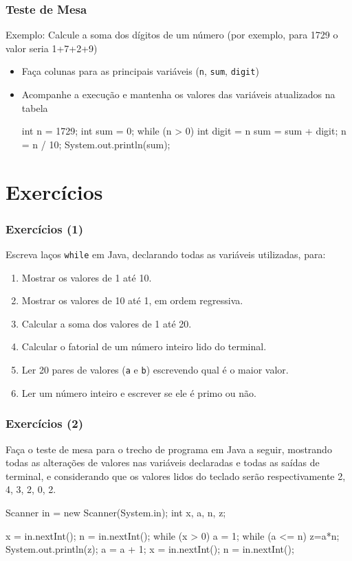 \documentclass[xcolor={dvipsnames,table},aspectratio=169]{beamer}
\begin{document}
\begin{frame}[fragile]\frametitle{Teste de Mesa}
Exemplo: Calcule a soma dos dígitos de um número (por exemplo, para 1729 o valor seria 1+7+2+9)
\begin{itemize}
	\item Faça colunas para as principais variáveis (\texttt{n}, \texttt{sum}, \texttt{digit})
	\item Acompanhe a execução e mantenha os valores das variáveis atualizados na tabela
\begin{javacode}
int n = 1729;
int sum = 0;
while (n > 0) {
   int digit = n %
   sum = sum + digit;
   n = n / 10;
}
System.out.println(sum);
\end{javacode}
\end{itemize}
\end{frame}

\section{Exercícios}

\begin{frame}\frametitle{Exercícios (1)}
Escreva laços \texttt{while} em Java, declarando todas as variáveis utilizadas, para:
\begin{enumerate}
	\item Mostrar os valores de 1 até 10.
	\item Mostrar os valores de 10 até 1, em ordem regressiva.
	\item Calcular a soma dos valores de 1 até 20.
	\item Calcular o fatorial de um número inteiro lido do terminal.
	\item Ler 20 pares de valores (\texttt{a} e \texttt{b}) escrevendo qual é o maior valor.
	\item Ler um número inteiro e escrever se ele é primo ou não.
\end{enumerate}
\end{frame}

\begin{frame}[fragile]\frametitle{Exercícios (2)}
Faça o teste de mesa para o trecho de programa em Java a seguir, mostrando todas as alterações de valores nas variáveis declaradas e todas as saídas de terminal, e considerando que os valores lidos do teclado serão respectivamente 2, 4, 3, 2, 0, 2.\\
{\scriptsize
\begin{javacode}
Scanner in = new Scanner(System.in);
int x, a, n, z;

x = in.nextInt();
n = in.nextInt();
while (x > 0) {
   a = 1;
   while (a <= n) {
      z=a*n;
      System.out.println(z);
      a = a + 1;
   }
   x = in.nextInt();
   n = in.nextInt();
}
\end{javacode}
}
\end{frame}
\end{document}
